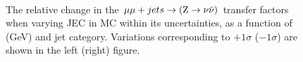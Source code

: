 \begin{figure}[!h]
  \centering
   ~~
  \\

  \caption{\label{fig:tfSyst_jec_mumuToZinv} The relative change in
  the $\mu\mu + jets \rightarrow ({\text Z} \rightarrow \nu\bar{\nu})$ transfer
  factors when varying JEC in MC within its uncertainties, as a function of \scalht (GeV) and jet category. 
  Variations corresponding to $+1\sigma$ ($-1\sigma$) are shown in the left (right) figure. 
  }
\end{figure}

